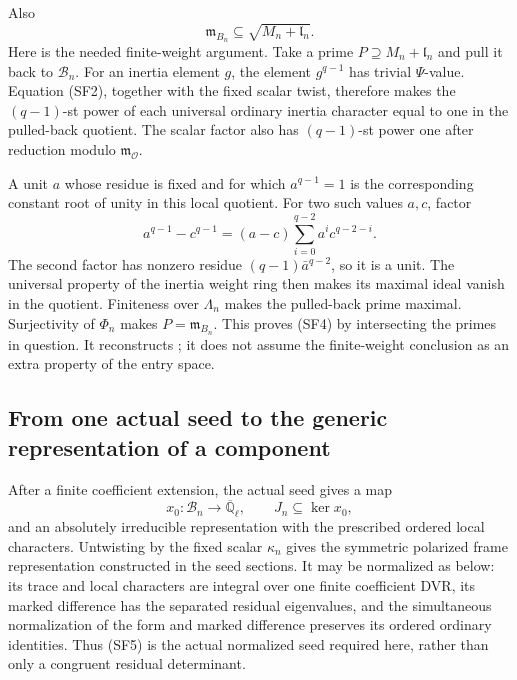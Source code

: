 Also
\[
                    \mathfrak m_{B_n}
                           \subseteq\sqrt{M_n+\mathfrak l_n}.
                                                               \tag{SF4}
\]
Here is the needed finite-weight argument.
Take a prime \(P\supseteq M_n+\mathfrak l_n\) and pull
it back to \(\mathcal B_n\).
For an inertia element \(g\), the element \(g^{q-1}\)
has trivial \(\Psi\)-value.
Equation (SF2), together with the fixed scalar twist,
therefore makes the \((q-1)\)-st power of each
universal ordinary inertia character equal to one
in the pulled-back quotient.
The scalar factor also has \((q-1)\)-st power one
after reduction modulo \(\mathfrak m_{\mathcal O}\).

A unit \(a\) whose residue is fixed and for which
\(a^{q-1}=1\) is the corresponding constant root of
unity in this local quotient. For two such values
\(a,c\), factor
\[
 a^{q-1}-c^{q-1}
   =(a-c)\sum_{i=0}^{q-2}a^ic^{q-2-i}.
\]
The second factor has nonzero residue
\((q-1)\bar a^{q-2}\), so it is a unit.
The universal property of the inertia weight ring
then makes its maximal ideal vanish in the quotient.
Finiteness over \(\Lambda_n\) makes the pulled-back
prime maximal. Surjectivity of \(\Phi_n\) makes
\(P=\mathfrak m_{B_n}\).
This proves (SF4) by intersecting the primes in question.
It reconstructs ;
it does not assume the finite-weight conclusion as an
extra property of the entry space.

\subsection{From one actual seed to the generic representation of a component}
After a finite coefficient extension, the actual seed
gives a map
\[
 x_0:\mathcal B_n\longrightarrow\overline{\mathbb Q}_\ell,
 \qquad J_n\subseteq\ker x_0,
                                                               \tag{SF5}
\]
and an absolutely irreducible representation with the
prescribed ordered local characters.
Untwisting by the fixed scalar \(\kappa_n\) gives
the symmetric polarized frame representation constructed
in the seed sections.
It may be normalized as below: its trace and local
characters are integral over one finite coefficient
DVR, its marked difference has the separated residual
eigenvalues, and the simultaneous normalization of
the form and marked difference preserves its ordered
ordinary identities.
Thus (SF5) is the actual normalized seed required
here, rather than only a congruent residual determinant.

